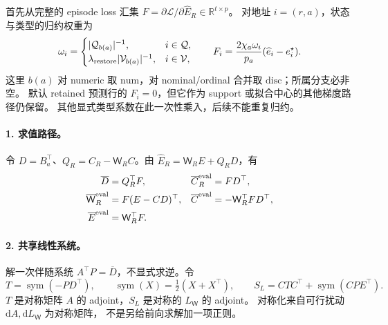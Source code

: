 \documentclass[11pt,UTF8,fontset=fandol]{ctexart}
\numberwithin{equation}{section}
\theoremstyle{definition}
\newcommand{\Vset}{\mathcal V}
\newcommand{\Qset}{\mathcal Q}
\newcommand{\R}{\mathbb R}
\begin{document}
首先从完整的 episode loss 汇集
$F=\partial\mathcal L/\partial\widehat E_R\in\R^{t\times p}$。
对地址 $i=(r,a)$，状态与类型的归约权重为
\begin{equation}
 \omega_i=\begin{cases}
 |\Qset_{b(a)}|^{-1},&i\in\Qset,\\
 \lambda_{\rm restore}|\Vset_{b(a)}|^{-1},&i\in\Vset,
 \end{cases}
 \qquad F_i=\frac{2\chi_a\omega_i}{p_a}(\widehat e_i-e_i^\star).
 \label{v53q:eq:loss-adjoint}
\end{equation}
这里 $b(a)$ 对 numeric 取 $\mathrm{num}$，对 nominal/ordinal 合并取 $\mathrm{disc}$；所属分支必非空。
默认 retained 预测行的 $F_i=0$，但它作为 support 或拟合中心的其他梯度路径仍保留。
其他显式类型系数在此一次性乘入，后续不能重复归约。

\paragraph{1. 求值路径。}
令 $D=B_a^\top$、$Q_R=C_R-\mathsf W_R C$。由
$\widehat E_R=\mathsf W_R E+Q_RD$，有
\begin{equation}
 \begin{aligned}
 \overline D&=Q_R^\top F,&
 \overline C_R^{\rm eval}&=FD^\top,\\
 \overline{\mathsf W}_R^{\rm eval}&=F(E-CD)^\top,&
 \overline C^{\rm eval}&=-\mathsf W_R^\top FD^\top,\\
 \overline E^{\rm eval}&=\mathsf W_R^\top F.
 \end{aligned}
 \label{v53:eq:reverse-evaluation}
\end{equation}

\paragraph{2. 共享线性系统。}
解一次伴随系统 $A^\top P=\overline D$，不显式求逆。令
\begin{equation}
 T=\operatorname{sym}(-PD^\top),\qquad
 \operatorname{sym}(X)=\tfrac12(X+X^\top),\qquad
 S_L=CTC^\top+\operatorname{sym}(CPE^\top).
 \label{v53:eq:reverse-system}
\end{equation}
$T$ 是对称矩阵 $A$ 的 adjoint，$S_L$ 是对称的 $L_{\mathsf W}$ 的 adjoint。
对称化来自可行扰动 $\mathrm dA,\mathrm dL_{\mathsf W}$ 为对称矩阵，
不是另给前向求解加一项正则。
\end{document}
